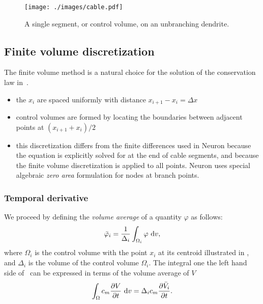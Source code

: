\begin{figure}
    \begin{center}
        \texttt{[image: ./images/cable.pdf]}
    \end{center}
    \caption{A single segment, or control volume, on an unbranching dendrite.}
    \label{fig:segment}
\end{figure}

\subsection{Finite volume discretization}
The finite volume method is a natural choice for the solution of the conservation law in~.

\begin{itemize}
    \item   the $x_i$ are spaced uniformly with distance $x_{i+1}-x_{i} = \Delta x$
    \item   control volumes are formed by locating the boundaries between adjacent points at $(x_{i+1}+x_{i})/2$
    \item   this discretization differs from the finite differences used in Neuron because the equation is explicitly solved for at the end of cable segments, and because the finite volume discretization is applied to all points. Neuron uses special algebraic \emph{zero area} formulation for nodes at branch points.
\end{itemize}

\subsubsection{Temporal derivative}
We proceed by defining the \emph{volume average} of a quantity $\varphi$ as follows:
\begin{equation}
    \bar{\varphi}_i = \frac{1}{\Delta_i} \int_{\Omega_i}{\varphi}~\text{d}{v},
\end{equation}
where $\Omega_i$ is the control volume with the point $x_i$ at its centroid illustrated in , and $\Delta_i$ is the volume of the control volume $\Omega_i$.
The integral one the left hand side of~ can be expressed in terms of the volume average of $V$
\begin{equation}
    \int_{\Omega}{c_m \frac{\partial{V}}{\partial{t}} } ~\text{d}{v} = \Delta_i c_m \frac{\partial{\bar{V}_i}}{\partial{t}}.
    \label{eq:dvdt}
\end{equation}

